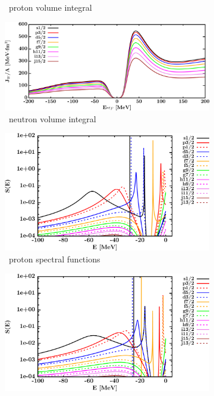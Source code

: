 \begin{figure}[hbtp]
\begin{subfigure}[b]{0.45\textwidth}
        \caption{\caEight\ proton volume integral}
        \label{DOMFitData_ca48_proton_potentialIntegral}
    \end{subfigure}\hspace{6pt}
    \begin{subfigure}[b]{0.45\textwidth}
        \centering
        \includegraphics[width=\linewidth]{figures/ca48_neutronVolumeIntegrals.png}
        \caption{\caEight\ neutron volume integral}
        \label{DOMFitData_ca48_neutron_potentialIntegral}
    \end{subfigure}\vspace{0.3in}
    \begin{subfigure}[b]{0.45\textwidth}
        \centering
        \includegraphics[width=\linewidth]{figures/ca48_protonSpectralFunctions.png}
        \caption{\caEight\ proton spectral functions}
        \label{DOMFitData_ca48_proton_spectralFunctions}
    \end{subfigure}\hspace{6pt}
    \begin{subfigure}[b]{0.45\textwidth}
        \centering
        \includegraphics[width=\linewidth]{figures/ca48_neutronSpectralFunctions.png}

\end{subfigure}
\end{figure}
